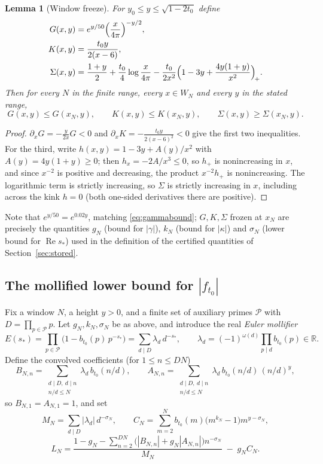 \documentclass[11pt]{article}
\newtheorem{lemma}[theorem]{Lemma}
\theoremstyle{definition}
\newcommand{\R}{\mathbb{R}}
\newcommand{\calP}{\mathcal{P}}
\DeclareMathOperator{\Rea}{Re}
\begin{document}
\begin{lemma}[Window freeze]\label{lem:freeze}
For $y_0\le y\le\sqrt{1-2t_0}$ define
\begin{align*}
G(x,y) &= e^{y/50}\Bigl(\frac{x}{4\pi}\Bigr)^{-y/2},
\\
K(x,y) &= \frac{t_0y}{2(x-6)},
\\
\Sigma(x,y) &= \frac{1+y}{2}+\frac{t_0}{4}\log\frac{x}{4\pi}
-\frac{t_0}{2x^2}\Bigl(1-3y+\frac{4y(1+y)}{x^2}\Bigr)_{\!+}.
\end{align*}
Then for every $N$ in the finite range, every $x\in W_N$ and every $y$
in the stated range,
\[
G(x,y)\le G(x_N,y),\qquad
K(x,y)\le K(x_N,y),\qquad
\Sigma(x,y)\ge\Sigma(x_N,y).
\]
\end{lemma}

\begin{proof}
$\partial_xG=-\frac{y}{2x}G<0$ and
$\partial_xK=-\frac{t_0y}{2(x-6)^2}<0$ give the first two
inequalities. For the third, write
$h(x,y)=1-3y+A(y)/x^2$ with $A(y)=4y(1+y)\ge0$; then
$h_x=-2A/x^3\le0$, so $h_+$ is nonincreasing in $x$, and since
$x^{-2}$ is positive and decreasing, the product $x^{-2}h_+$ is
nonincreasing. The logarithmic term is strictly increasing, so
$\Sigma$ is strictly increasing in $x$, including across the kink
$h=0$ (both one-sided derivatives there are positive).
\end{proof}

Note that $e^{y/50}=e^{0.02y}$, matching \eqref{eq:gammabound}; $G,K,\Sigma$
frozen at $x_N$ are precisely the quantities $g_N$ (bound for
$|\gamma|$), $k_N$ (bound for $|\kappa|$) and $\sigma_N$ (lower bound
for $\Rea s_*$) used in the definition of the certified quantities of Section~\ref{sec:stored}.

\subsection{The mollified lower bound for $|f_{t_0}|$}\label{sec:native}

Fix a window $N$, a height $y>0$, and a finite set of auxiliary primes
$\calP$ with $D=\prod_{p\in\calP}p$. Let $g_N,k_N,\sigma_N$ be as
above, and introduce the real \emph{Euler mollifier}
\[
E(s_*)=\prod_{p\in\calP}\bigl(1-b_{t_0}(p)\,p^{-s_*}\bigr)
=\sum_{d\mid D}\lambda_d\,d^{-s_*},
\qquad
\lambda_d=(-1)^{\omega(d)}\prod_{p\mid d}b_{t_0}(p)\in\R .
\]
Define the convolved coefficients (for $1\le n\le DN$)
\[
B_{N,n}=\sum_{\substack{d\mid D,\ d\mid n\\ n/d\le N}}
\lambda_d\,b_{t_0}(n/d),
\qquad
A_{N,n}=\sum_{\substack{d\mid D,\ d\mid n\\ n/d\le N}}
\lambda_d\,b_{t_0}(n/d)\,(n/d)^y,
\]
so $B_{N,1}=A_{N,1}=1$, and set
\[
M_N=\sum_{d\mid D}|\lambda_d|\,d^{-\sigma_N},
\qquad
C_N=\sum_{m=2}^{N}b_{t_0}(m)\bigl(m^{k_N}-1\bigr)m^{y-\sigma_N},
\]
\begin{equation}\label{eq:LN}
L_N=\frac{1-g_N-\sum_{n=2}^{DN}
\bigl(|B_{N,n}|+g_N|A_{N,n}|\bigr)n^{-\sigma_N}}{M_N}
\;-\;g_NC_N .
\end{equation}
\end{document}
